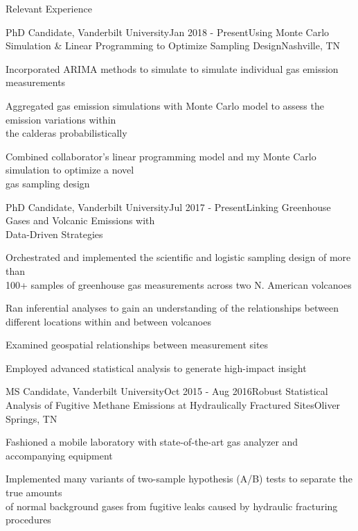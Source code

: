 \documentclass{resume} %
\begin{document}
\begin{rSection}{Relevant Experience}
\begin{rSubsection}{PhD Candidate, Vanderbilt University}{Jan 2018 - Present}{Using Monte Carlo Simulation \& Linear Programming to Optimize Sampling Design}{Nashville, TN}
\item {Incorporated ARIMA methods to simulate to simulate individual gas emission measurements}
\item {Aggregated gas emission simulations with Monte Carlo model to assess the emission variations within \\ the calderas probabilistically}
\item {Combined collaborator's linear programming model and my Monte Carlo simulation to optimize a novel \\ gas sampling design}

\end{rSubsection}


\begin{rSubsection}{PhD Candidate, Vanderbilt University}{Jul 2017 - Present}{Linking Greenhouse Gases and Volcanic Emissions with \\ Data-Driven Strategies}{}
\item {Orchestrated and implemented the scientific and logistic sampling design of more than \\ 100+ samples of greenhouse gas measurements across two N. American volcanoes}
\item {Ran inferential analyses to gain an understanding of the relationships between \\ different locations within and between volcanoes}
\item {Examined geospatial relationships between measurement sites}
\item {Employed advanced statistical analysis to generate high-impact insight}

\end{rSubsection}


\begin{rSubsection}{MS Candidate, Vanderbilt University}{Oct 2015 - Aug 2016}{Robust Statistical Analysis of Fugitive Methane Emissions at Hydraulically Fractured Sites}{Oliver Springs, TN}
\item {Fashioned a mobile laboratory with state-of-the-art gas analyzer and accompanying equipment}
\item {Implemented many variants of two-sample hypothesis (A/B) tests to separate the true amounts \\ of normal background gases from fugitive leaks caused by hydraulic fracturing procedures}

\end{rSubsection}


\end{rSection} 
\end{document}
